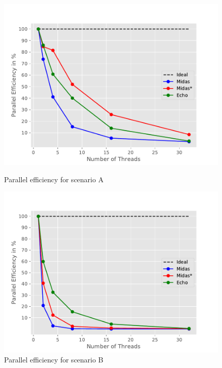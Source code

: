 
\begin{figure}
\begin{minipage}[l]{0.50\textwidth}
        \includegraphics[width=\textwidth]{figures/bench/eff-ss}
        \caption{Parallel efficiency for scenario A}
\end{minipage}
\begin{minipage}[l]{0.50\textwidth}
        \includegraphics[width=\textwidth]{figures/bench/eff-sl}
        \caption{Parallel efficiency for scenario B}
\end{minipage}


\end{figure}
